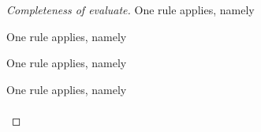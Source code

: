 \begin{proof}[Completeness of evaluate]
    {One rule applies, namely \\
   }

    {One rule applies, namely \\
    }

    {One rule applies, namely \\
      }

    {One rule applies, namely\\ \\

}
\end{proof}
